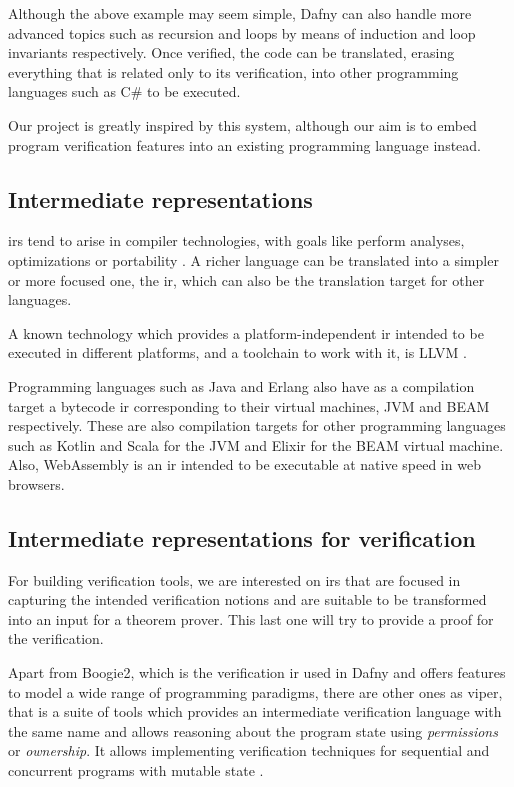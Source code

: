 Although the above example may seem simple, Dafny can also handle more advanced
topics such as recursion and loops by means of induction and loop invariants
respectively. Once verified, the code can be translated, erasing everything that
is related only to its verification, into other programming languages such as
C\# to be executed. 

Our project is greatly inspired by this system, although our aim is to embed
program verification features into an existing programming language instead.

\subsection{Intermediate representations}

\gls{ir}s tend to arise in compiler technologies, with goals like perform
analyses, optimizations or portability \citep{FormalizingLLVMIR}. A richer
language can be translated into a simpler or more focused one, the \gls{ir},
which can also be the translation target for other languages.

A known technology which provides a platform-independent \gls{ir} intended to be
executed in different platforms, and a toolchain to work with it, is LLVM
\citep{LLVM}.

Programming languages such as Java and Erlang also have as a compilation target
a bytecode \gls{ir} corresponding to their virtual machines, JVM and BEAM
respectively. These are also compilation targets for other programming languages
such as Kotlin and Scala for the JVM and Elixir for the BEAM virtual machine.
Also, WebAssembly is an \gls{ir} intended to be executable at native speed in
web browsers.

\subsection{Intermediate representations for verification}

For building verification tools, we are interested on \gls{ir}s that are focused
in capturing the intended verification notions and are suitable to be
transformed into an input for a theorem prover.  This last one will try to
provide a proof for the verification.

Apart from Boogie2, which is the verification \gls{ir} used in Dafny and offers 
features to model a wide range of programming paradigms, there are other ones as
\gls{viper}, that is a suite of tools which provides an intermediate
verification language with the same name and allows reasoning about the program
state using \textit{permissions} or \textit{ownership}. It allows implementing 
verification techniques for sequential and concurrent programs with mutable
state \citep{viper}.


